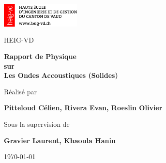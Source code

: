\newcommand{\supervisor}{Gravier Laurent, Khaoula Hanin}

\begin{titlepage}
    \begin{center}
        \includegraphics[width=0.3\textwidth]{png/HEIG_1.png} %
        \vspace{8cm}
        
        {\Large HEIG-VD}
        
        \vspace{1cm}
        \textbf{\Huge Rapport de Physique}
        \textbf{\Huge \\sur}
        \vspace{0.5cm}
        \textbf{\Huge \\Les Ondes Accoustiques (Solides)}

        \vspace{1.5cm}
        \large{Réalisé par}
        
        \vspace{0.3cm}
        {\Large \textbf{Pitteloud Célien, Rivera Evan, Roeslin Olivier}}
        
        \vspace{0.5 cm}
        \large{Sous la supervision de}
        
        \vspace{0.3cm}
        {\Large \textbf{\supervisor}}
        
        \vfill
        
        \vfill
        \large{\today}
        
    \end{center}
\end{titlepage}
